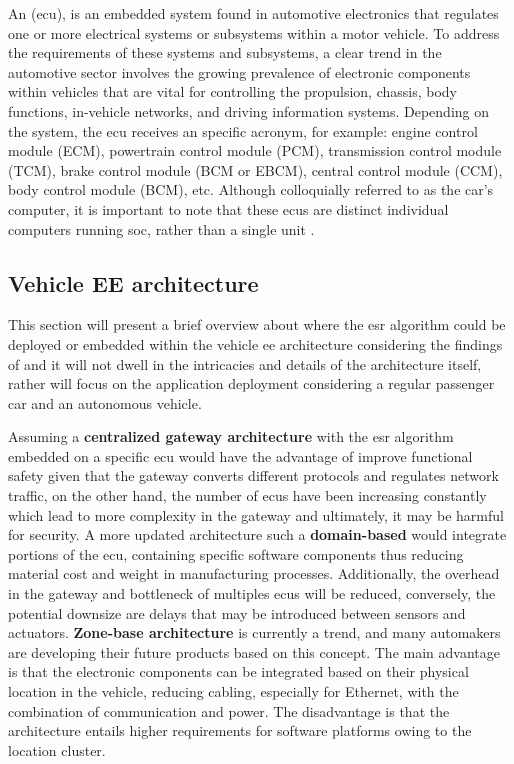 An  (\gls{ecu}), is an embedded system found in automotive electronics that regulates one or more electrical systems or subsystems within a motor vehicle. To address the requirements of these systems and subsystems, a clear trend in the automotive sector involves the growing prevalence of electronic components within vehicles that are vital for controlling the propulsion, chassis, body functions, in-vehicle networks, and driving information systems. Depending on the system, the \gls{ecu} receives an specific acronym, for example: engine control module (ECM), powertrain control module (PCM), transmission control module (TCM), brake control module (BCM or EBCM), central control module (CCM), body control module (BCM), etc. Although colloquially referred to as the car's computer, it is important to note that these \gls{ecu}s are distinct individual computers running \gls{soc}, rather than a single unit \cite{Aptiv2020}.


\subsection{Vehicle EE architecture}
\label{subsec:ECU_common_units_in_market}

This section will present a brief overview about where the \gls{esr} algorithm could be deployed or embedded within the vehicle \gls{ee} architecture considering the findings of \textcite{Zhu2021} and it will not dwell in the intricacies and details of the architecture itself, rather will focus on the application deployment considering a regular passenger car and an autonomous vehicle.

Assuming a \textbf{centralized gateway architecture} with the \gls{esr} algorithm embedded on a specific \gls{ecu} would have the advantage of improve functional safety given that the gateway converts different protocols and regulates network traffic, on the other hand,  the number of \gls{ecu}s have been increasing constantly which lead to more complexity in the gateway and ultimately, it may be harmful for security. A more updated architecture such a \textbf{domain-based} would integrate portions of the \gls{ecu}, containing specific software components thus reducing material cost and weight in manufacturing processes. Additionally, the overhead in the gateway and bottleneck of multiples \gls{ecu}s will be reduced, conversely, the potential downsize are delays that may be introduced between sensors and actuators. \textbf{Zone-base architecture} is currently a trend, and many automakers are developing their future products based on this concept. The main advantage is that the electronic components can be integrated based on their physical location in the vehicle, reducing cabling, especially for Ethernet, with the combination of communication and power. The disadvantage is that the architecture entails higher requirements for software platforms owing to the location cluster.

